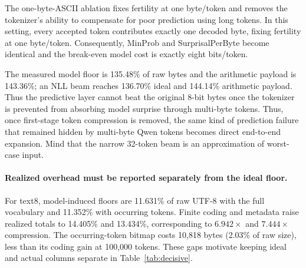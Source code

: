 \documentclass{article}
\begin{document}
The one-byte-ASCII ablation fixes fertility at one byte/token and removes the tokenizer's ability to compensate for poor prediction using long tokens. In this setting, every accepted token contributes exactly one decoded byte, fixing fertility at one byte/token. Consequently, MinProb and SurprisalPerByte become identical and the break-even model cost is exactly eight bits/token.

The measured model floor is 135.48\% of raw bytes and the arithmetic payload is 143.36\%; an NLL beam reaches 136.70\% ideal and 144.14\% arithmetic payload. Thus the predictive layer cannot beat the original 8-bit bytes once the tokenizer is prevented from absorbing model surprise through multi-byte tokens. Thus, once first-stage token compression is removed, the same
kind of prediction failure that remained hidden by multi-byte Qwen tokens becomes direct end-to-end expansion. Mind that the narrow 32-token beam is an approximation of worst-case input.

\paragraph{Realized overhead must be reported separately from the ideal floor.}
For text8, model-induced floors are 11.631\% of raw UTF-8 with the full vocabulary and 11.352\% with occurring tokens. Finite coding and metadata raise realized totals to 14.405\% and 13.434\%, corresponding to $6.942\times$ and $7.444\times$ compression. The occurring-token bitmap costs 10,818 bytes (2.03\% of raw size), less than its coding gain at 100,000 tokens. These gaps motivate keeping ideal and actual columns separate in Table~\ref{tab:decisive}.
\end{document}
